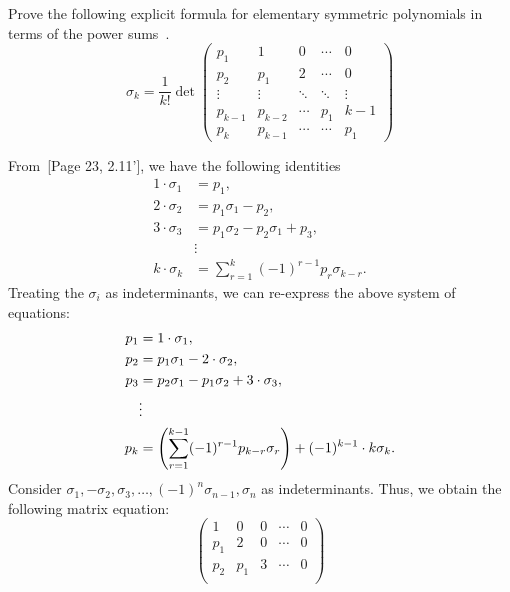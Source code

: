 \documentclass[letterpaper, 11pt, oneside]{book}
\begin{document}
\begin{exercise}
  Prove the following explicit formula for elementary symmetric polynomials in terms of the power sums~\cite[Page 29]{book:MacdonaldSymmetricHall}.
  \[
    \sigma_{k} = \frac{1}{k!}
    \det
    \begin{pmatrix}
      p_{1} & 1 & 0 & \cdots & 0 \\
      p_{2} & p_{1} & 2 & \cdots & 0 \\
      \vdots & \vdots & \ddots & \ddots & \vdots \\
      p_{k - 1} & p_{k - 2} & \cdots & p_{1} & k - 1 \\
      p_{k} & p_{k - 1} & \cdots & \cdots & p_{1}
    \end{pmatrix}
  \]
\end{exercise}
\begin{pf}
  From~[Page 23, 2.11']\cite{book:MacdonaldSymmetricHall}, we have the following identities
  \begin{align*}
    1 \cdot \sigma_{1} &= p_{1}, \\
    2 \cdot \sigma_{2} &= p_{1} \sigma_{1} - p_{2}, \\
    3 \cdot \sigma_{3} &= p_{1} \sigma_{2} - p_{2} \sigma_{1} + p_{3}, \\
                       &\vdots \\
    k \cdot \sigma_{k} &= \sum_{r = 1}^{k} (-1)^{r - 1} p_{r} \sigma_{k - r}.
  \end{align*}
Treating the $\sigma_{i}$ as indeterminants, we can re-express the above system of equations:
\begin{align*}
  p_{1} &= 1 \cdot \sigma_{1}, \\
  p_{2} &= p_{1} \sigma_{1} - 2 \cdot \sigma_{2}, \\
  p_{3} &= p_{2} \sigma_{1} - p_{1} \sigma_{2} + 3 \cdot \sigma_{3}, \\
        &\vdots \\
  p_{k} &= \pqty{\sum_{r = 1}^{k - 1} (-1)^{r - 1} p_{k - r} \sigma_{r}} + (-1)^{k - 1} \cdot k \sigma_{k}.
\end{align*}
Consider $\sigma_{1}, -\sigma_{2}, \sigma_{3}, \ldots, (-1)^{n} \sigma_{n - 1}, \sigma_{n}$ as indeterminants.
Thus, we obtain the following matrix equation:
\[
  \begin{pmatrix}
    1 & 0 & 0 & \cdots & 0 \\
    p_{1} & 2 & 0 & \cdots & 0 \\
    p_{2} & p_{1} & 3 & \cdots & 0 \\

\end{pmatrix}\]
\end{pf}
\end{document}
